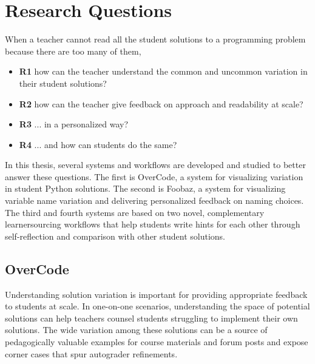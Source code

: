 \section{Research Questions}

When a teacher cannot read all the student solutions to a programming problem because there are too many of them,
\begin{itemize}
\item {\bf R1} how can the teacher understand the common and uncommon variation in their student solutions?
\item {\bf R2} how can the teacher give feedback on approach and readability at scale?
\item {\bf R3} ... in a personalized way?
\item {\bf R4} ... and how can students do the same?
\end{itemize}

In this thesis, several systems and workflows are developed and studied to better answer these questions. The first is OverCode, a system for visualizing variation in student Python solutions. The second is Foobaz, a system for visualizing variable name variation and delivering personalized feedback on naming choices. The third and fourth systems are based on two novel, complementary learnersourcing workflows that help students write hints for each other through self-reflection and comparison with other student solutions.


\subsection{OverCode}

Understanding solution variation is important for providing appropriate feedback to students at scale. In one-on-one scenarios, understanding the space of potential solutions can help teachers counsel students struggling to implement their own solutions. The wide variation among these solutions can be a source of pedagogically valuable examples for course materials and forum posts and expose corner cases that spur autograder refinements.

